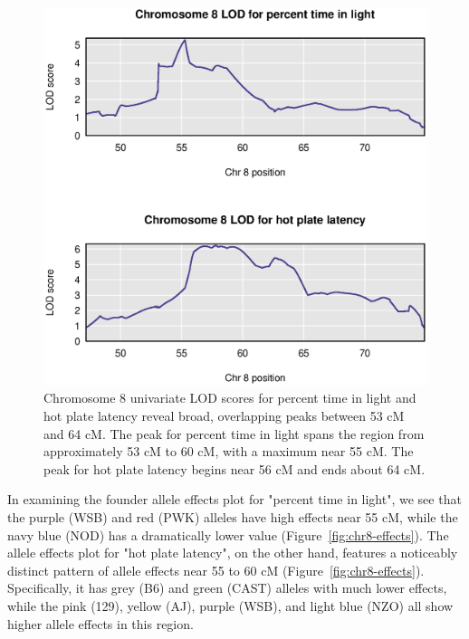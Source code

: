 \documentclass[12pt,twoside, lineno]{gsajnl}
\begin{document}
\begin{figure}
\includegraphics[width = \textwidth]{../Rmd/chr8-lods.eps}
\caption{Chromosome 8 univariate LOD scores for percent time in light
  and hot plate latency reveal broad, overlapping peaks between 53 cM
  and 64 cM. The peak for percent time in light spans the region from
  approximately 53 cM to 60 cM, with a maximum near 55 cM. The peak
  for hot plate latency begins near 56 cM and ends about 64 cM.}
\label{fig:chr8-lod}
\end{figure}



In examining the founder allele effects plot for "percent time in
light", we see that the purple (WSB) and red (PWK) alleles have high
effects near 55 cM, while the navy blue (NOD) has a dramatically lower
value (Figure~\ref{fig:chr8-effects}). The allele effects plot for
"hot plate latency", on the other hand, features a noticeably distinct
pattern of allele effects near 55 to 60 cM (Figure~\ref{fig:chr8-effects}).
Specifically, it has grey (B6) and green
(CAST) alleles with much lower effects, while the pink (129), yellow
(AJ), purple (WSB), and light blue (NZO) all show higher allele
effects in this region.
\end{document}
